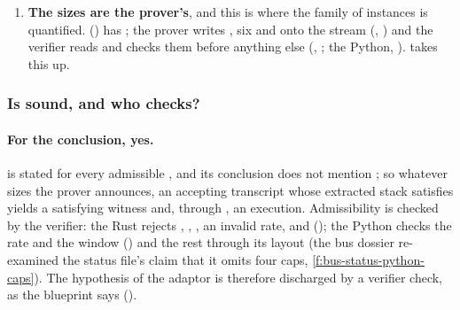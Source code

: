 \begin{enumerate}
  s are \enquote{theorems about the layout, not branches of }; it does
  not say that these two are parsing obligations of the fixture harness and, later, of
  end-to-end soundness's (T7)  (\cref{f:boundary-parse}).
\item \textbf{The sizes are the prover's}, and this is where the family of instances is
  quantified.  () has
  ; the prover writes , six  and
   onto the stream (, ) and the
  verifier reads and checks them before anything else (,
  ; the Python, ).
   takes this up.
\end{enumerate}

\subsubsection{Is \texorpdfstring{\protect{}}{the existential over the sizes} sound, and who checks?}\label{sec:gen-boundary-sizes-exists}

\paragraph{For the conclusion, yes.}  is stated for every admissible
, and its conclusion  does not mention
; so whatever sizes the prover announces, an accepting transcript whose extracted stack
satisfies  yields a satisfying witness and,
through , an execution. Admissibility is checked by the verifier: the
Rust rejects , , , an invalid rate, and
 (); the Python checks the rate and the 
window () and the rest through its layout (the bus dossier
re-examined the status file's claim that it omits four caps, \cref{f:bus-status-python-caps}).
The hypothesis  of the adaptor is therefore discharged by a verifier
check, as the blueprint says ().

